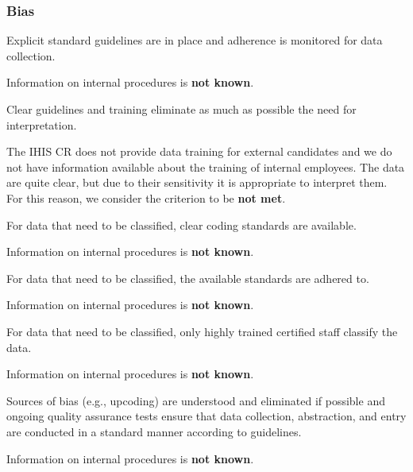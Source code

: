 \subsubsection{Bias}

\begin{QandA}
    \item Explicit standard guidelines are in place and adherence is monitored for data collection.
    \begin{answered}
        Information on internal procedures is \textbf{not known}.
    \end{answered}

    \item Clear guidelines and training eliminate as much as possible the need for interpretation.
    \begin{answered}
        The IHIS CR does not provide data training for external candidates and we do not have information available about the training of internal employees.
        The data are quite clear, but due to their sensitivity it is appropriate to interpret them.
        For this reason, we consider the criterion to be \textbf{not met}.
    \end{answered}

    \item For data that need to be classified, clear coding standards are available.
    \begin{answered}
        Information on internal procedures is \textbf{not known}.
    \end{answered}

    \item For data that need to be classified, the available standards are adhered to.
    \begin{answered}
        Information on internal procedures is \textbf{not known}.
    \end{answered}

    \item For data that need to be classified, only highly trained certified staff classify the data.
    \begin{answered}
        Information on internal procedures is \textbf{not known}.
    \end{answered}

    \item Sources of bias (e.g., upcoding) are understood and eliminated if possible and ongoing quality assurance tests ensure that data collection, abstraction, and entry are conducted in a standard manner according to guidelines.
    \begin{answered}
        Information on internal procedures is \textbf{not known}.
    \end{answered}

\end{QandA}


